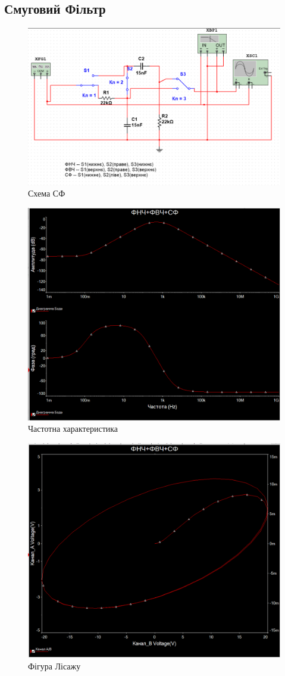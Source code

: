 \documentclass[
  ukrainian,
  14pt
]{extreport}
\begin{document}
\subsection{Смуговий Фільтр}
\begin{figure}[H]
  \centering
  \includegraphics[width=.6\textwidth]{imgs/SF-1.png}
  \caption{Схема СФ}
\end{figure}
\begin{figure}[H]
  \centering
  \includegraphics[width=.6\textwidth]{imgs/SF-2.png}
  \caption{Частотна характеристика}
\end{figure}
\begin{figure}[H]
  \centering
  \includegraphics[width=.6\textwidth]{imgs/SF-3.png}
  \caption{Фігура Лісажу}
\end{figure}
\end{document}
